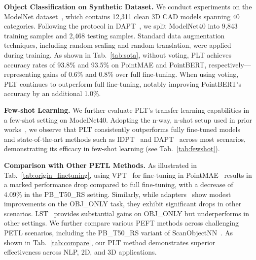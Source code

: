 
\textbf{Object Classification on Synthetic Dataset.} We conduct experiments on the ModelNet dataset~\cite{wu20153d}, which contains 12,311 clean 3D CAD models spanning 40 categories. Following the protocol in DAPT~\cite{zhou2024dynamic}, we split ModelNet40 into 9,843 training samples and 2,468 testing samples. Standard data augmentation techniques, including random scaling and random translation, were applied during training. As shown in Tab.~\ref{tab:sota}, without voting, PLT achieves accuracy rates of 93.8\% and 93.5\% on PointMAE and PointBERT, respectively—representing gains of 0.6\% and 0.8\% over full fine-tuning. When using voting, PLT continues to outperform full fine-tuning, notably improving PointBERT’s accuracy by an additional 1.0\%.

\textbf{Few-shot Learning.} We further evaluate PLT’s transfer learning capabilities in a few-shot setting on ModelNet40. Adopting the n-way, n-shot setup used in prior works~\cite{pang2022masked,zha2023instance,zhou2024dynamic}, we observe that PLT consistently outperforms fully fine-tuned models and state-of-the-art methods such as IDPT~\cite{zha2023instance} and DAPT~\cite{zhou2024dynamic} across most scenarios, demonstrating its efficacy in few-shot learning (see Tab.~\ref{tab:fewshot}).

\textbf{Comparison with Other PETL Methods.} As illustrated in Tab.~\ref{tab:origin_finetuning}, using VPT~\cite{jia2022visual} for fine-tuning in PointMAE~\cite{pang2022masked} results in a marked performance drop compared to full fine-tuning, with a decrease of 4.09\% in the PB\_T50\_RS setting. Similarly, while adapters~\cite{houlsby2019parameter} show modest improvements on the OBJ\_ONLY task, they exhibit significant drops in other scenarios. LST~\cite{sung2022lst} provides substantial gains on OBJ\_ONLY but underperforms in other settings. We further compare various PEFT methods across challenging PETL scenarios, including the PB\_T50\_RS variant of ScanObjectNN~\cite{uy2019revisiting}. As shown in Tab.~\ref{tab:compare}, our PLT method demonstrates superior effectiveness across NLP, 2D, and 3D applications.


